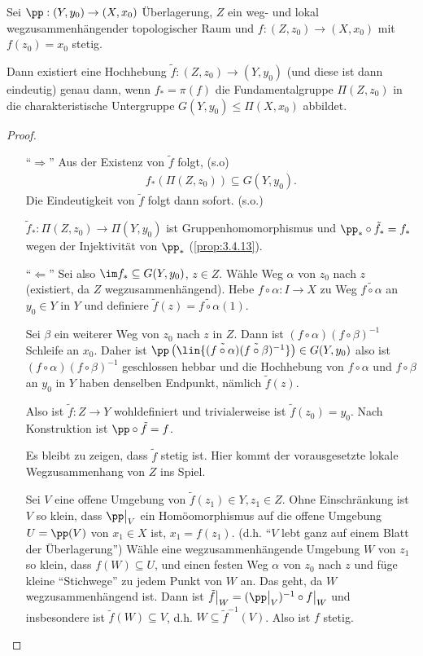 \begin{prop}[Hochhebbarkeitskriterium]
\label{prop:3.4.15}
Sei $\pp: (Y,y_0)\to (X,x_0)$ Überlagerung, $Z$ ein weg- und lokal
wegzusammenhängender topologischer Raum und $f: (Z,z_0)\to (X,x_0)$ mit
$f(z_0) = x_0$ stetig.

Dann existiert eine Hochhebung $\tilde{f}: (Z,z_0)\to (Y,y_0)$ (und diese ist
dann eindeutig) genau dann, wenn $f_* = \pi(f)$ die Fundamentalgruppe
$\Pi(Z,z_0)$ in die charakteristische Untergruppe $G(Y,y_0)\leqslant
\Pi(X,x_0)$ abbildet.\fishhere
\end{prop}
\begin{proof}
\begin{enumerate}
  \item[``$\Rightarrow$''] Aus der Existenz von $\tilde{f}$ folgt, (s.o)
 \begin{align*}
 f_*(\Pi(Z,z_0)) \subseteq G(Y,y_0).
 \end{align*}
 Die Eindeutigkeit von $\tilde{f}$ folgt dann sofort. (s.o.)
\begin{bemn}
  $\tilde{f}_*: \Pi(Z,z_0)\to \Pi(Y,y_0)$ ist Gruppenhomomorphismus und
  $\pp_*\circ\tilde{f}_* = f_*$ wegen der Injektivität von $\pp_*$
  (\ref{prop:3.4.13}).
\end{bemn}
  \item[``$\Leftarrow$''] Sei also $\im f_*\subseteq G(Y,y_0)$, $z\in Z$. Wähle
  Weg $\alpha$ von $z_0$ nach $z$ (existiert, da $Z$ wegzusammenhängend). Hebe
  $f\circ\alpha : I\to X$ zu Weg $\widetilde{f\circ\alpha}$ an $y_0\in Y$ in $Y$
  und definiere $\tilde{f}(z) = \widetilde{f\circ\alpha}(1)$.
  
Sei $\beta$ ein weiterer Weg von $z_0$ nach $z$ in $Z$. Dann ist
$(f\circ\alpha)(f\circ\beta)^{-1}$ Schleife an $x_0$. Daher ist
$\pp\left(\lin{(\tilde{f\circ\alpha})(\tilde{f\circ\beta})^{-1}}\right)\in
G(Y,y_0)$ also ist $(f\circ\alpha)(f\circ\beta)^{-1}$ geschlossen hebbar und
die Hochhebung von $f\circ\alpha$ und $f\circ\beta$ an $y_0$ in $Y$ haben
denselben Endpunkt, nämlich $\tilde{f}(z)$.

Also ist $\tilde{f}: Z\to Y$ wohldefiniert und trivialerweise ist
$\tilde{f}(z_0) = y_0$. Nach Konstruktion ist $\pp\circ\tilde{f} = f$.

Es bleibt zu zeigen, dass $\tilde{f}$ stetig ist. Hier kommt der vorausgesetzte
lokale Wegzusammenhang von $Z$ ins Spiel.

Sei $V$ eine offene Umgebung von $\tilde{f}(z_1)\in Y, z_1\in Z$. Ohne
Einschränkung ist $V$ so klein, dass $\pp\big|_{V}$ ein Homöomorphismus auf die
offene Umgebung $U=\pp(V)$ von $x_1\in X$ ist, $x_1=f(z_1)$. (d.h. ``$V$ lebt
ganz auf einem Blatt der Überlagerung'') Wähle eine wegzusammenhängende
Umgebung $W$ von $z_1$ so klein, dass $f(W)\subseteq U$, und einen festen Weg
$\alpha$ von $z_0$ nach $z$ und füge kleine ``Stichwege'' zu jedem Punkt von
$W$ an.
Das geht, da $W$ wegzusammenhängend ist. Dann ist $\tilde{f}\big|_W =
(\pp\big|_V)^{-1} \circ f\big|_W$ und insbesondere ist $\tilde{f}(W)\subseteq
V$, d.h. $W\subseteq \tilde{f}^{-1}(V)$. Also ist $f$ stetig.\qedhere
\end{enumerate}
\end{proof}

